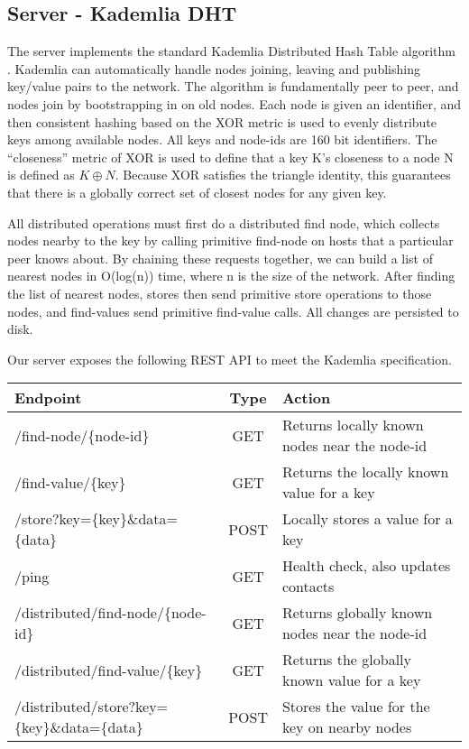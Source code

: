 \documentclass[a4paper,10pt]{article}
\begin{document}
\subsection{Server - Kademlia DHT}
The server implements the standard Kademlia Distributed Hash Table algorithm 
\cite{kademlia}\cite{xlattice}.  Kademlia can automatically handle nodes 
joining, leaving and publishing key/value pairs to the network.  The algorithm 
is fundamentally peer 
to peer, and nodes join by bootstrapping in on old nodes.  Each node is given 
an identifier, and then consistent hashing based on the XOR metric is used to 
evenly distribute keys among available nodes.  All keys and node-ids are 160 
bit identifiers. The ``closeness''  metric of XOR is used to define that a key 
K's closeness to a node N is defined as $K \oplus N$.  Because XOR satisfies the 
triangle identity, this guarantees that there is a globally correct set of 
closest nodes for any given key.

All distributed operations must first do a distributed find node, which 
collects nodes nearby to the key by calling primitive find-node on hosts that a 
particular peer knows about.  By chaining these requests together, we can build 
a list of nearest nodes in O(log(n)) time, where n is the size of the network.  
After finding the list of nearest nodes, stores then send primitive store 
operations to those nodes, and find-values send primitive find-value calls.  
All changes are persisted to disk.

Our server exposes the following REST API to meet the Kademlia specification.  
\begin{center}
\begin{tabular}{| l | c | p{5cm} |}
\hline                       
\textbf{Endpoint} & \textbf{Type}& \textbf{Action}\\
\hline
/find-node/\{node-id\} & GET & Returns locally known nodes near the node-id\\
\hline
/find-value/\{key\} & GET & Returns the locally known value for a key\\
\hline
/store?key=\{key\}\&data=\{data\} & POST & Locally stores a value for a key\\
\hline
/ping & GET & Health check, also updates contacts\\
\hline
/distributed/find-node/\{node-id\} & GET & Returns globally known nodes near 
the node-id\\
\hline
/distributed/find-value/\{key\} & GET & Returns the globally known value for a 
key\\
\hline
/distributed/store?key=\{key\}\&data=\{data\} & POST & Stores the value for the
key on nearby nodes 

\end{tabular}
\end{center}
\end{document}
